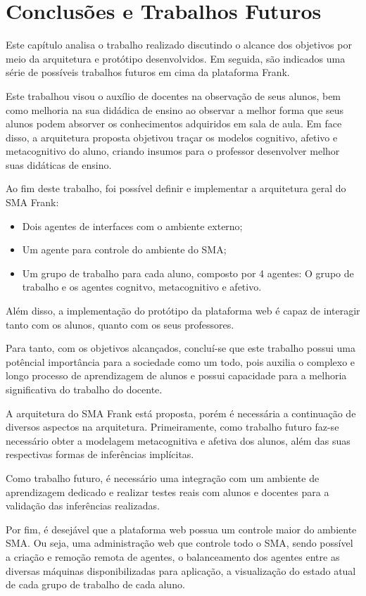 \chapter{Conclusões e Trabalhos Futuros}
Este capítulo analisa o trabalho realizado discutindo o alcance dos objetivos por meio da arquitetura e protótipo desenvolvidos. Em seguida, são indicados uma série de possíveis trabalhos futuros em cima da plataforma Frank.

Este trabalhou visou o auxílio de docentes na observação de seus alunos, bem como melhoria na sua didádica de ensino ao observar a melhor forma que seus alunos podem absorver os conhecimentos adquiridos em sala de aula. Em face disso, a arquitetura proposta objetivou traçar os modelos cognitivo,  afetivo e metacognitivo do aluno, criando insumos para o professor desenvolver melhor suas didáticas de ensino.

Ao fim deste trabalho, foi possível definir e implementar a arquitetura geral do SMA Frank:
\begin{itemize}
 	\item Dois agentes de interfaces com o ambiente externo;
	\item Um agente para controle do ambiente do SMA;
	\item Um grupo de trabalho para cada aluno, composto por 4 agentes: O grupo de trabalho e os agentes cognitvo, metacognitivo e afetivo.
\end{itemize}

Além disso, a implementação do protótipo da plataforma web é capaz de interagir tanto com os alunos, quanto com os seus professores.

Para tanto, com os objetivos alcançados, concluí-se que este trabalho possui uma potêncial importância para a sociedade como um todo, pois auxilia o complexo e longo processo de aprendizagem de alunos e possui capacidade para a melhoria significativa do trabalho do docente.

A arquitetura do SMA Frank está proposta, porém é necessária a continuação de diversos aspectos na arquitetura. Primeiramente, como trabalho futuro faz-se necessário obter a modelagem metacognitiva e afetiva dos alunos, além das suas respectivas formas de inferências implícitas.

Como trabalho futuro, é necessário uma integração com um ambiente de aprendizagem dedicado e realizar testes reais com alunos e docentes para a validação das inferências realizadas.

Por fim, é desejável que a plataforma web possua um controle maior do ambiente SMA. Ou seja, uma administração web que controle todo o SMA, sendo possível a criação e remoção remota de agentes, o balanceamento dos agentes entre as diversas máquinas disponibilizadas para aplicação, a visualização do estado atual de cada grupo de trabalho de cada aluno.
